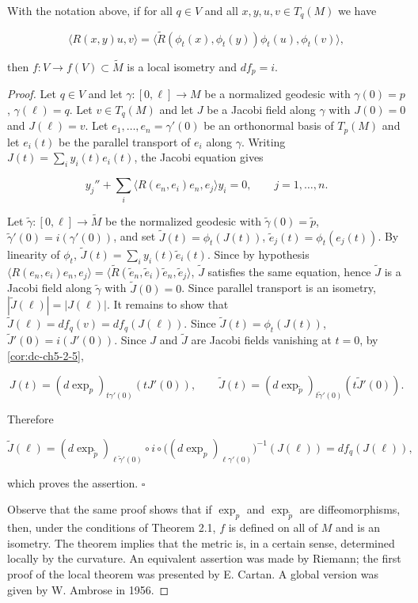 \begin{theorem}[E. Cartan]
  \label{thm:dc-ch8-2-1}
  \notready
  With the notation above, if for all $q\in V$ and all $x,y,u,v\in T_q(M)$ we have
  
  $$
  \langle R(x,y)u,v\rangle=\big\langle\tilde{R}(\phi_t(x),\phi_t(y))\phi_t(u),\phi_t(v)\big\rangle,
  $$
  
  then $f:V\to f(V)\subset\tilde{M}$ is a local isometry and $df_p=i$.
\end{theorem}
\begin{proof}
  Let $q\in V$ and let $\gamma:[0,\ell]\to M$ be a normalized geodesic with
  $\gamma(0)=p$, $\gamma(\ell)=q$. Let $v\in T_q(M)$ and let $J$ be a Jacobi field
  along $\gamma$ with $J(0)=0$ and $J(\ell)=v$. Let $e_1,\dots,e_n=\gamma'(0)$ be an
  orthonormal basis of $T_p(M)$ and let $e_i(t)$ be the parallel transport of $e_i$
  along $\gamma$. Writing $J(t)=\sum_i y_i(t)e_i(t)$, the Jacobi equation gives
  
  $$
  y_j''+\sum_i\langle R(e_n,e_i)e_n,e_j\rangle y_i=0,\qquad j=1,\dots,n.
  $$
  
  Let $\tilde{\gamma}:[0,\ell]\to\tilde{M}$ be the normalized geodesic with
  $\tilde{\gamma}(0)=\tilde{p}$, $\tilde{\gamma}'(0)=i(\gamma'(0))$, and set
  $\tilde{J}(t)=\phi_t(J(t))$, $\tilde{e}_j(t)=\phi_t(e_j(t))$. By linearity of
  $\phi_t$, $\tilde{J}(t)=\sum_i y_i(t)\tilde{e}_i(t)$. Since by hypothesis
  $\langle R(e_n,e_i)e_n,e_j\rangle=\langle\tilde{R}(\tilde{e}_n,\tilde{e}_i)\tilde{e}_n,\tilde{e}_j\rangle$,
  $\tilde{J}$ satisfies the same equation, hence $\tilde{J}$ is a Jacobi field along
  $\tilde{\gamma}$ with $\tilde{J}(0)=0$. Since parallel transport is an isometry,
  $|\tilde{J}(\ell)|=|J(\ell)|$. It remains to show that $\tilde{J}(\ell)=df_q(v)=df_q(J(\ell))$.
  Since $\tilde{J}(t)=\phi_t(J(t))$, $\tilde{J}'(0)=i(J'(0))$. Since $J$ and
  $\tilde{J}$ are Jacobi fields vanishing at $t=0$, by \cref{cor:dc-ch5-2-5},
  
  $$
  J(t)=(d\exp_p)_{t\gamma'(0)}(tJ'(0)),\qquad\tilde{J}(t)=(d\exp_{\tilde{p}})_{t\tilde{\gamma}'(0)}(t\tilde{J}'(0)).
  $$
  
  Therefore
  
  $$
  \tilde{J}(\ell)=(d\exp_{\tilde{p}})_{\ell\tilde{\gamma}'(0)}\circ i\circ\big((d\exp_p)_{\ell\gamma'(0)}\big)^{-1}(J(\ell))=df_q(J(\ell)),
  $$
  
  which proves the assertion. $\square$
  
  Observe that the same proof shows that if $\exp_p$ and $\exp_{\tilde{p}}$ are
  diffeomorphisms, then, under the conditions of Theorem 2.1, $f$ is defined on all
  of $M$ and is an isometry. The theorem implies that the metric is, in a certain
  sense, determined locally by the curvature. An equivalent assertion was made by
  Riemann; the first proof of the local theorem was presented by E. Cartan. A global
  version was given by W. Ambrose in 1956.
\end{proof}

